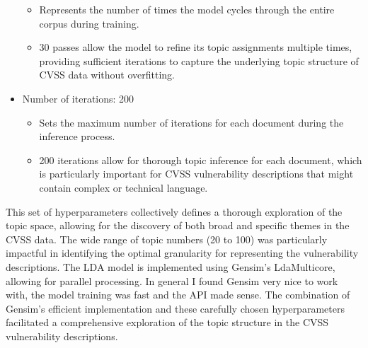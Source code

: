 \documentclass[12pt]{article}
\begin{document}
\begin{itemize}
	      \begin{itemize}

		      \item Represents the number of times the model cycles through the entire corpus during
		            training.

		      \item 30 passes allow the model to refine its topic assignments multiple times,
		            providing sufficient iterations to capture the underlying topic structure of CVSS
		            data without overfitting.

	      \end{itemize}

	\item Number of iterations: {200}

	      \begin{itemize}

		      \item Sets the maximum number of iterations for each document during the inference
		            process.

		      \item 200 iterations allow for thorough topic inference for each document, which is
		            particularly important for CVSS vulnerability descriptions that might contain
		            complex or technical language.

	      \end{itemize}

\end{itemize}

This set of hyperparameters collectively defines a thorough exploration of the topic space, allowing
for the discovery of both broad and specific themes in the CVSS data. The wide range of topic
numbers (20 to 100) was particularly impactful in identifying the optimal granularity for
representing the vulnerability descriptions. The LDA model is implemented using Gensim's
LdaMulticore\cite{gensim}, allowing for parallel processing. In general I found Gensim very nice to
work with, the model training was fast and the API made sense. The combination of Gensim's efficient
implementation and these carefully chosen hyperparameters facilitated a comprehensive exploration of
the topic structure in the CVSS vulnerability descriptions.

\end{document}
